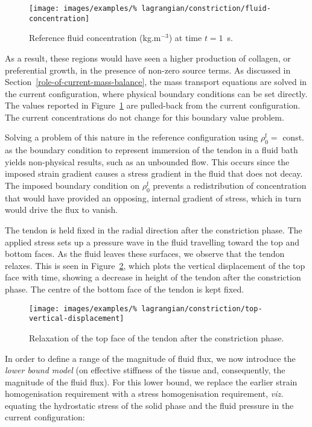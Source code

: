 \begin{figure}[!hpt]
  \centering
  \texttt{[image: images/examples/\%
    lagrangian/constriction/fluid-concentration]}
  \caption{Reference fluid concentration (kg.m$^{-3}$) at time
    $t=1$~s.}
  \label{eg2conc}
\end{figure}

As a result, these regions would have seen a higher production of
collagen, or preferential growth, in the presence of non-zero source
terms. As discussed in Section~\ref{role-of-current-mass-balance}, the
mass transport equations are solved in the current configuration,
where physical boundary conditions can be set directly. The values
reported in Figure~\ref{eg2conc} are pulled-back from the current
configuration. The current concentrations do not change for this
boundary value problem.

Solving a problem of this nature in the reference configuration using
$\rho_0^\mathrm{f} = $ const. as the boundary condition to represent
immersion of the tendon in a fluid bath yields non-physical results,
such as an unbounded flow. This occurs since the imposed strain
gradient causes a stress gradient in the fluid that does not
decay. The imposed boundary condition on $\rho_0^\mathrm{f}$ prevents
a redistribution of concentration that would have provided an
opposing, internal gradient of stress, which in turn would drive the
flux to vanish.


The tendon is held fixed in the radial direction after the
constriction phase. The applied stress sets up a pressure wave in the
fluid travelling toward the top and bottom faces. As the fluid leaves
these surfaces, we observe that the tendon relaxes. This is seen in
Figure~\ref{topdisp}, which plots the vertical displacement of the top
face with time, showing a decrease in height of the tendon after the
constriction phase. The centre of the bottom face of the tendon is
kept fixed.

\begin{figure}[!hpt]
  \centering
  \texttt{[image: images/examples/\%
    lagrangian/constriction/top-vertical-displacement]}
  \caption{Relaxation of the top face of the tendon after the
    constriction phase.}
  \label{topdisp}
\end{figure}

In order to define a range of the magnitude of fluid flux, we now
introduce the {\em lower bound model} (on effective stiffness of the
tissue and, consequently, the magnitude of the fluid flux). For this
lower bound, we replace the earlier strain homogenisation requirement
with a stress homogenisation requirement, {\em viz.} equating the
hydrostatic stress of the solid phase and the fluid pressure in the
current configuration:

